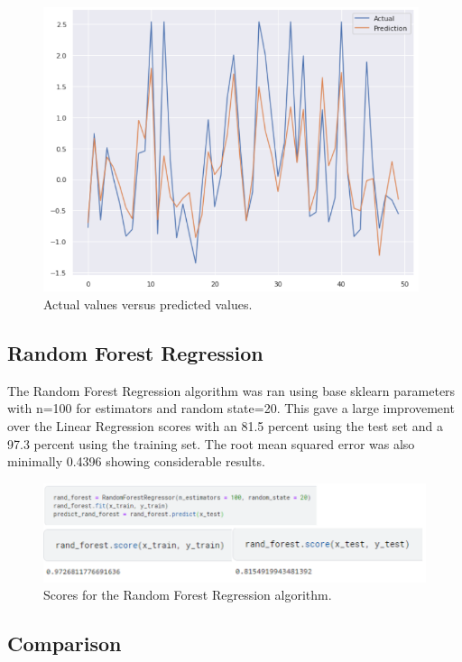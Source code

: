 \documentclass{article}
\begin{document}
\begin{figure}[H]
\includegraphics[width=11.0cm]{Images/linreg_comparisonI.png}
\caption{\label{fig:linreg_comparisonI}Actual values versus predicted values.}
\end{figure}

\subsection{Random Forest Regression}

The Random Forest Regression algorithm was ran using base sklearn parameters with n=100 for estimators and random state=20. This gave a large improvement over the Linear Regression scores with an 81.5 percent using the test set and a 97.3 percent using the training set. The root mean squared error was also minimally 0.4396 showing considerable results. 

\begin{figure}[H]
\centering
\includegraphics[width=12.0cm]{Images/rand_forest_score.png}
\caption{\label{fig:rand_forest_score}Scores for the Random Forest Regression algorithm.}
\end{figure}

\subsection{Comparison}
\end{document}

